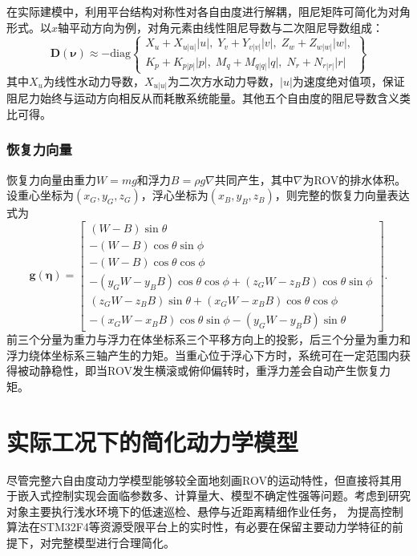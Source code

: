 在实际建模中，利用平台结构对称性对各自由度进行解耦，阻尼矩阵可简化为对角形式。以$x$轴平动方向为例，对角元素由线性阻尼导数与二次阻尼导数组成：
\begin{equation}
    \boldsymbol{D}(\boldsymbol{\nu})\approx
    -\mathrm{diag}
    \left\{
    \begin{array}{l}
        X_u+X_{u|u|}|u|,\;
        Y_v+Y_{v|v|}|v|,\;
        Z_w+Z_{w|w|}|w|,\\
        K_p+K_{p|p|}|p|,\;
        M_q+M_{q|q|}|q|,\;
        N_r+N_{r|r|}|r|
    \end{array}
    \right\}
    \label{eq:D_full_diag}
\end{equation}
其中$X_u$为线性水动力导数，$X_{u|u|}$为二次方水动力导数，$|u|$为速度绝对值项，保证阻尼力始终与运动方向相反从而耗散系统能量。其他五个自由度的阻尼导数含义类比可得。

\subsubsection{恢复力向量}

恢复力向量由重力$W=mg$和浮力$B=\rho g\nabla$共同产生，其中$\nabla$为ROV的排水体积。设重心坐标为$(x_G,y_G,z_G)$，浮心坐标为$(x_B,y_B,z_B)$，则完整的恢复力向量表达式为
\begin{equation}
    \boldsymbol{g}(\boldsymbol{\eta})=
    \begin{bmatrix}
        (W-B)\sin\theta \\
        -(W-B)\cos\theta\sin\phi \\
        -(W-B)\cos\theta\cos\phi \\
        -(y_GW-y_BB)\cos\theta\cos\phi+(z_GW-z_BB)\cos\theta\sin\phi \\
        (z_GW-z_BB)\sin\theta+(x_GW-x_BB)\cos\theta\cos\phi \\
        -(x_GW-x_BB)\cos\theta\sin\phi-(y_GW-y_BB)\sin\theta
    \end{bmatrix}.
    \label{eq:g_full}
\end{equation}
前三个分量为重力与浮力在体坐标系三个平移方向上的投影，后三个分量为重力和浮力绕体坐标系三轴产生的力矩。当重心位于浮心下方时，系统可在一定范围内获得被动静稳性，即当ROV发生横滚或俯仰偏转时，重浮力差会自动产生恢复力矩。

\section{实际工况下的简化动力学模型}

尽管完整六自由度动力学模型能够较全面地刻画ROV的运动特性，但直接将其用于嵌入式控制实现会面临参数多、计算量大、模型不确定性强等问题。考虑到研究对象主要执行浅水环境下的低速巡检、悬停与近距离精细作业任务，
为提高控制算法在STM32F4等资源受限平台上的实时性，有必要在保留主要动力学特征的前提下，对完整模型进行合理简化。

